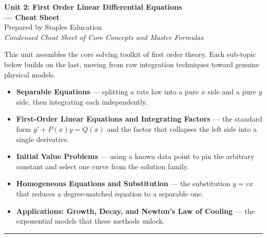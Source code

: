 \documentclass[11pt]{article}
\begin{document}
\begin{center}
    {\LARGE \bfseries Unit 2: First Order Linear Differential Equations \\--- Cheat Sheet}\\[6pt]
    {\large Prepared by Staples Education}\\[4pt]
    {\itshape Condensed Cheat Sheet of Core Concepts and Master Formulas}
\end{center}

\vspace{0.4em}

\begin{topicsbox}
This unit assembles the core solving toolkit of first order theory. Each
sub-topic below builds on the last, moving from raw integration techniques
toward genuine physical models.
\begin{itemize}[leftmargin=1.4em, itemsep=3pt]
    \item \textbf{Separable Equations} --- splitting a rate law into a pure
          $x$ side and a pure $y$ side, then integrating each independently.
    \item \textbf{First-Order Linear Equations and Integrating Factors} ---
          the standard form $y' + P(x)y = Q(x)$ and the factor that collapses
          the left side into a single derivative.
    \item \textbf{Initial Value Problems} --- using a known data point to pin
          the arbitrary constant and select one curve from the solution family.
    \item \textbf{Homogeneous Equations and Substitution} --- the
          substitution $y = vx$ that reduces a degree-matched equation to a
          separable one.
    \item \textbf{Applications: Growth, Decay, and Newton's Law of Cooling}
          --- the exponential models that these methods unlock.
\end{itemize}
\end{topicsbox}

\vspace{0.6em}
\hrule
\vspace{0.6em}

\end{document}
